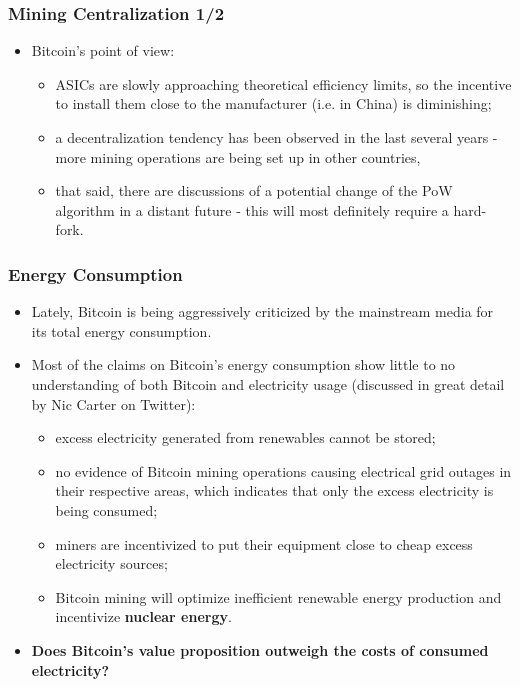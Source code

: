 \documentclass{beamer}
\begin{document}
\begin{frame}
  \frametitle{Mining Centralization 1/2}
  \begin{itemize}
  \item Bitcoin's point of view:
    \begin{itemize}
    \item ASICs are slowly approaching theoretical efficiency limits, so the
      incentive to install them close to the manufacturer (i.e. in China) is
      diminishing;
    \item a decentralization tendency has been observed in the last several
      years - more mining operations are being set up in other countries,
    \item that said, there are discussions of a potential change of the PoW
      algorithm in a distant future - this will most definitely require a
      hard-fork.
    \end{itemize}
  \end{itemize}
\end{frame}

\begin{frame}
  \frametitle{Energy Consumption}
  \begin{itemize}
  \item Lately, Bitcoin is being aggressively criticized by the mainstream
    media for its total energy consumption.
  \item Most of the claims on Bitcoin's energy consumption show little to no
    understanding of both Bitcoin and electricity usage (discussed in great
    detail by Nic Carter on Twitter):
    \begin{itemize}
    \item excess electricity generated from renewables cannot be stored;
    \item no evidence of Bitcoin mining operations causing electrical grid
      outages in their respective areas, which indicates that only the excess
      electricity is being consumed;
    \item miners are incentivized to put their equipment close to cheap excess
      electricity sources;
    \item Bitcoin mining will optimize inefficient renewable energy production
      and incentivize \textbf{nuclear energy}.
    \end{itemize}
  \item \textbf{Does Bitcoin's value proposition outweigh the costs of
      consumed electricity?}
  \end{itemize}
\end{frame}
\end{document}
